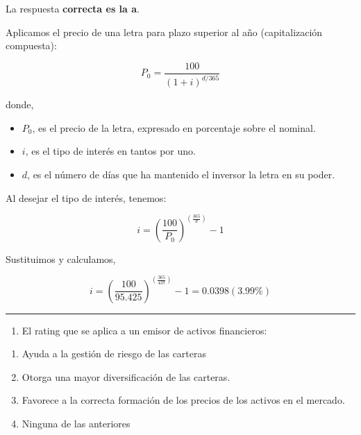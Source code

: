 \documentclass[
  letterpaper,
  DIV=11,
  numbers=noendperiod]{scrreprt}
\providecommand{\tightlist}{%
  \setlength{\itemsep}{0pt}\setlength{\parskip}{0pt}}\usepackage{longtable,booktabs,array}
\begin{document}
\begin{tcolorbox}[enhanced jigsaw, left=2mm, opacityback=0, colback=white, breakable, arc=.35mm, bottomrule=.15mm, rightrule=.15mm, toprule=.15mm, leftrule=.75mm, colframe=quarto-callout-tip-color-frame]
\begin{minipage}[t]{5.5mm}
\textcolor{quarto-callout-tip-color}{\faLightbulb}
\end{minipage}%
\begin{minipage}[t]{\textwidth - 5.5mm}

La respuesta \textbf{correcta es la a}.

Aplicamos el precio de una letra para plazo superior al año
(capitalización compuesta):

\[P_0=\frac{100}{(1+i)^{d/365}}\]

donde,

\begin{itemize}
\item
  \(P_0\), es el precio de la letra, expresado en porcentaje sobre el
  nominal.
\item
  \(i\), es el tipo de interés en tantos por uno.
\item
  \(d\), es el número de días que ha mantenido el inversor la letra en
  su poder.
\end{itemize}

Al desejar el tipo de interés, tenemos:

\[i=\left(\frac{100}{P_0}\right)^{\left(\frac{365}{d}\right) }-1\]

Sustituimos y calculamos,

\[i=\left(\frac{100}{95.425}\right)^{\left(\frac{365}{437}\right) }-1=0.0398(3.99\%)\]

\end{minipage}%
\end{tcolorbox}

\begin{center}\rule{0.5\linewidth}{0.5pt}\end{center}

\begin{enumerate}
\def\labelenumi{\arabic{enumi}.}
\setcounter{enumi}{25}
\tightlist
\item
  El rating que se aplica a un emisor de activos financieros:
\end{enumerate}

\begin{enumerate}
\def\labelenumi{\alph{enumi}.}
\item
  Ayuda a la gestión de riesgo de las carteras
\item
  Otorga una mayor diversificación de las carteras.
\item
  Favorece a la correcta formación de los precios de los activos en el
  mercado.
\item
  Ninguna de las anteriores
\end{enumerate}
\end{document}
